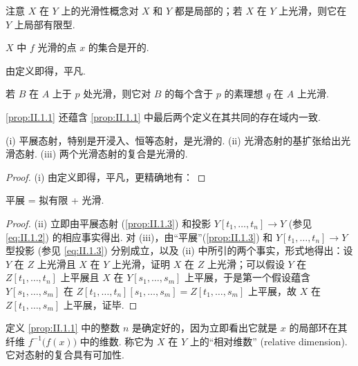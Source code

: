 注意 $X$ 在 $Y$ 上的光滑性概念对 $X$ 和 $Y$ 都是局部的；若 $X$ 在 $Y$ 上光滑，则它在 $Y$ 上局部有限型.

\begingroup
\addtocounter{theorem}{-1}%
\renewcommand{\thetheorem}{\thesection.1}%
\begin{proposition}\label{prop:II.1.1}
$X$ 中 $f$ 光滑的点 $x$ 的集合是开的.
\end{proposition}

\endgroup

由定义即得，平凡.

\begin{corollary}\label{cor:II.1.2}
若 $B$ 在 $A$ 上于 $p$ 处光滑，则它对 $B$ 的每个含于 $p$ 的素理想 $q$ 在 $A$ 上光滑.
\end{corollary}

\ref{prop:II.1.1} 还蕴含 \ref{prop:II.1.1} 中最后两个定义在其共同的存在域内一致.

\begin{proposition}\label{prop:II.1.3}
(i) 平展态射，特别是开浸入、恒等态射，是光滑的. (ii) 光滑态射的基扩张给出光滑态射. (iii) 两个光滑态射的复合是光滑的.
\end{proposition}

\begin{proof}
(i) 由定义即得，平凡，更精确地有：
\end{proof}

\begin{corollary}\label{cor:II.1.4}
平展 = 拟有限 + 光滑.
\end{corollary}

\begin{proof}
(ii) 立即由平展态射 (\ref{prop:II.1.3}) 和投影 $Y[t_1, \dots, t_n] \to Y$ (参见 \eqref{eq:II.1.2}) 的相应事实得出. 对 (iii)，由``平展''(\ref{prop:II.1.3}) 和 $Y[t_1, \dots, t_n] \to Y$ 型投影 (参见 \eqref{eq:II.1.3}) 分别成立，以及 (ii) 中所引的两个事实，形式地得出：设 $Y$ 在 $Z$ 上光滑且 $X$ 在 $Y$ 上光滑，证明 $X$ 在 $Z$ 上光滑；可以假设 $Y$ 在 $Z[t_1, \dots, t_n]$ 上平展且 $X$ 在 $Y[s_1, \dots, s_m]$ 上平展，于是第一个假设蕴含 $Y[s_1, \dots, s_m]$ 在 $Z[t_1, \dots, t_n][s_1, \dots, s_m] = Z[t_1, \dots, s_m]$ 上平展，故 $X$ 在 $Z[t_1, \dots, s_m]$ 上平展，证毕.
\end{proof}

\begin{remark}\label{rem:II.1.5}
定义 \ref{prop:II.1.1} 中的整数 $n$ 是确定好的，因为立即看出它就是 $x$ 的局部环在其纤维 $f^{-1}\bigl(f(x)\bigr)$ 中的维数. 称它为 $X$ 在 $Y$ 上的``相对维数'' (relative dimension). 它对态射的复合具有可加性.
\end{remark}

